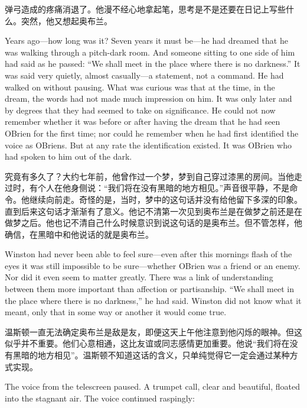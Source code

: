 \begin{paracol}{2}
弹弓造成的疼痛消退了。他漫不经心地拿起笔，思考是不是还要在日记上写些什么。突然，他又想起奥布兰。

\switchcolumn*

Years ago---how long was it? Seven years it must be---he had dreamed
that he was walking through a pitch-dark room. And someone sitting to
one side of him had said as he passed: ``We shall meet in the place where
there is no darkness.'' It was said very quietly, almost casually---a
statement, not a command. He had walked on without pausing. What was
curious was that at the time, in the dream, the words had not made much
impression on him. It was only later and by degrees that they had seemed
to take on significance. He could not now remember whether it was before
or after having the dream that he had seen O\textquotesingle Brien for
the first time; nor could he remember when he had first identified the
voice as O\textquotesingle Brien\textquotesingle s. But at any rate the
identification existed. It was O\textquotesingle Brien who had spoken to
him out of the dark.

\switchcolumn

究竟有多久了？大约七年前，他曾作过一个梦，梦到自己穿过漆黑的房间。当他走过时，有个人在他身侧说：``我们将在没有黑暗的地方相见。''声音很平静，不是命令。他继续向前走。奇怪的是，当时，梦中的这句话并没有给他留下多深的印象。直到后来这句话才渐渐有了意义。他记不清第一次见到奥布兰是在做梦之前还是在做梦之后。他也记不清自己什么时候意识到说这句话的是奥布兰。但不管怎样，他确信，在黑暗中和他说话的就是奥布兰。

\switchcolumn*

Winston had never been able to feel sure---even after this
morning\textquotesingle s flash of the eyes it was still impossible to
be sure---whether O\textquotesingle Brien was a friend or an enemy. Nor
did it even seem to matter greatly. There was a link of understanding
between them more important than affection or partisanship. ``We shall
meet in the place where there is no darkness,'' he had said. Winston did
not know what it meant, only that in some way or another it would come
true.

\switchcolumn

温斯顿一直无法确定奥布兰是敌是友，即便这天上午他注意到他闪烁的眼神。但这似乎并不重要。他们心意相通，这比友谊或同志感情更加重要。他说``我们将在没有黑暗的地方相见''。温斯顿不知道这话的含义，只单纯觉得它一定会通过某种方式实现。

\switchcolumn*

The voice from the telescreen paused. A trumpet call, clear and
beautiful, floated into the stagnant air. The voice continued raspingly:


\end{paracol}
